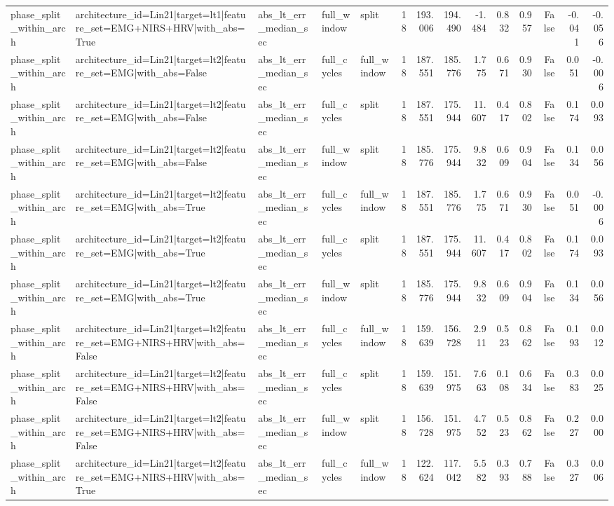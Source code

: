 \begin{table}
\begin{tabular}{lllllrrrrrrrrr}
phase_split_within_arch & architecture_id=Lin21|target=lt1|feature_set=EMG+NIRS+HRV|with_abs=True & abs_lt_err_median_sec & full_window & split & 18 & 193.006 & 194.490 & -1.484 & 0.832 & 0.957 & False & -0.041 & -0.056 \\
phase_split_within_arch & architecture_id=Lin21|target=lt2|feature_set=EMG|with_abs=False & abs_lt_err_median_sec & full_cycles & full_window & 18 & 187.551 & 185.776 & 1.775 & 0.671 & 0.930 & False & 0.051 & -0.006 \\
phase_split_within_arch & architecture_id=Lin21|target=lt2|feature_set=EMG|with_abs=False & abs_lt_err_median_sec & full_cycles & split & 18 & 187.551 & 175.944 & 11.607 & 0.417 & 0.802 & False & 0.174 & 0.093 \\
phase_split_within_arch & architecture_id=Lin21|target=lt2|feature_set=EMG|with_abs=False & abs_lt_err_median_sec & full_window & split & 18 & 185.776 & 175.944 & 9.832 & 0.609 & 0.904 & False & 0.134 & 0.056 \\
phase_split_within_arch & architecture_id=Lin21|target=lt2|feature_set=EMG|with_abs=True & abs_lt_err_median_sec & full_cycles & full_window & 18 & 187.551 & 185.776 & 1.775 & 0.671 & 0.930 & False & 0.051 & -0.006 \\
phase_split_within_arch & architecture_id=Lin21|target=lt2|feature_set=EMG|with_abs=True & abs_lt_err_median_sec & full_cycles & split & 18 & 187.551 & 175.944 & 11.607 & 0.417 & 0.802 & False & 0.174 & 0.093 \\
phase_split_within_arch & architecture_id=Lin21|target=lt2|feature_set=EMG|with_abs=True & abs_lt_err_median_sec & full_window & split & 18 & 185.776 & 175.944 & 9.832 & 0.609 & 0.904 & False & 0.134 & 0.056 \\
phase_split_within_arch & architecture_id=Lin21|target=lt2|feature_set=EMG+NIRS+HRV|with_abs=False & abs_lt_err_median_sec & full_cycles & full_window & 18 & 159.639 & 156.728 & 2.911 & 0.523 & 0.862 & False & 0.193 & 0.012 \\
phase_split_within_arch & architecture_id=Lin21|target=lt2|feature_set=EMG+NIRS+HRV|with_abs=False & abs_lt_err_median_sec & full_cycles & split & 18 & 159.639 & 151.975 & 7.663 & 0.108 & 0.634 & False & 0.383 & 0.025 \\
phase_split_within_arch & architecture_id=Lin21|target=lt2|feature_set=EMG+NIRS+HRV|with_abs=False & abs_lt_err_median_sec & full_window & split & 18 & 156.728 & 151.975 & 4.752 & 0.523 & 0.862 & False & 0.227 & 0.000 \\
phase_split_within_arch & architecture_id=Lin21|target=lt2|feature_set=EMG+NIRS+HRV|with_abs=True & abs_lt_err_median_sec & full_cycles & full_window & 18 & 122.624 & 117.042 & 5.582 & 0.393 & 0.788 & False & 0.327 & 0.006 \\

\end{tabular}
\end{table}
